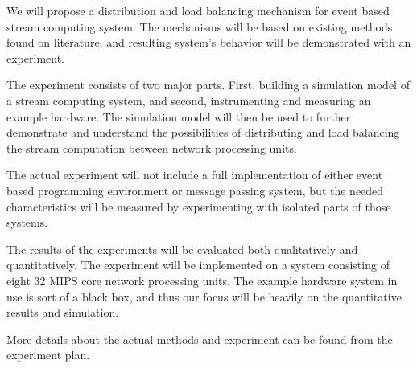 We will propose a distribution and load balancing mechanism for event based stream computing system. The mechanisms will be based on existing methods found on literature, and resulting system's behavior will be demonstrated with an experiment.

The experiment consists of two major parts. First, building a simulation model of a stream computing system, and second, instrumenting and measuring an example hardware. The simulation model will then be used to further demonstrate and understand the possibilities of distributing and load balancing the stream computation between network processing units.

The actual experiment will not include a full implementation of either event based programming environment or message passing system, but the needed characteristics will be measured by experimenting with isolated parts of those systems.

The results of the experiments will be evaluated both qualitatively and quantitatively. The experiment will be implemented on a system consisting of eight 32 MIPS core network processing units. The example hardware system in use is sort of a black box, and thus our focus will be heavily on the quantitative results and simulation.

More details about the actual methods and experiment can be found from the experiment plan.


